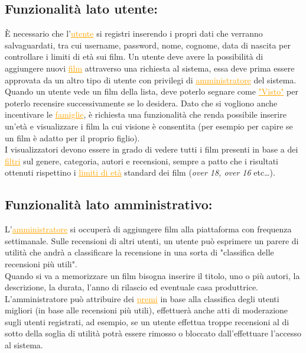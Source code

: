 \documentclass[a4paper,12pt]{report}
\begin{document}
	\subsection{Funzionalità lato utente:}
	È necessario che l'\textcolor{orange}{\underline{utente}} si registri inserendo i propri dati che verranno salvaguardati, tra cui username, password, nome, cognome, data di nascita per controllare i limiti di età sui film. Un utente deve avere la possibilità di aggiungere nuovi \textcolor{orange}{\underline{film}} attraverso una richiesta al sistema, essa deve prima essere approvata da un altro tipo di utente con privilegi di \textcolor{orange}{\underline{amministratore}} del sistema.\\
	Quando un utente vede un film della lista, deve poterlo segnare come \textcolor{orange}{\underline{"Visto"}} per poterlo recensire successivamente se lo desidera. Dato che si vogliono anche incentivare le \textcolor{orange}{\underline{famiglie}}, è richiesta una funzionalità che renda possibile inserire un'età e visualizzare i film la cui visione è consentita (per esempio per capire se un film è adatto per il proprio figlio).\\
	I visualizzatori devono essere in grado di vedere tutti i film presenti in base a dei \textcolor{orange}{\underline{filtri}} sul genere, categoria, autori e recensioni, sempre a patto che i risultati ottenuti rispettino i \textcolor{orange}{\underline{limiti di età}} standard dei film (\textit{over 18, over 16} etc\dots).
	\subsection{Funzionalità lato amministrativo:}
	L'\textcolor{orange}{\underline{amministratore}} si occuperà di aggiungere film alla piattaforma con frequenza settimanale. Sulle recensioni di altri utenti, un utente può esprimere un parere di utilità che andrà a classificare la recensione in una sorta di "classifica delle recensioni più utili".\\
	Quando si va a memorizzare un film bisogna inserire il titolo, uno o più autori, la descrizione, la durata, l'anno di rilascio ed eventuale casa produttrice.
	L'amministratore può attribuire dei \textcolor{orange}{\underline{premi}} in base alla classifica degli utenti migliori (in base alle recensioni più utili), effettuerà anche atti di moderazione sugli utenti registrati, ad esempio, se un utente effettua troppe recensioni al di sotto della soglia di utilità potrà essere rimosso o bloccato dall'effettuare l'accesso al sistema.
\end{document}
